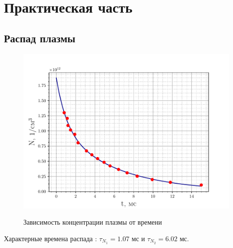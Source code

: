 \documentclass[10pt,pdf,hyperref={unicode}, dvipsnames]{beamer}
\begin{document}
\section{Практическая часть} %
\subsection{Распад  плазмы}
\begin{frame}

	\begin{figure}[tb]
		\centering
		\vspace{-20pt}
		\includegraphics[width=\linewidth]{fig/decay}
		\label{fig:2}
		\vspace{-20pt}
		\caption{Зависимость концентрации плазмы от времени}
		\vspace{-10pt}
	\end{figure}
	Характерные времена распада : $\tau_{N_1}=1.07$ мс и $\tau_{N_2}=6.02$ мс.
\end{frame}
\end{document}
